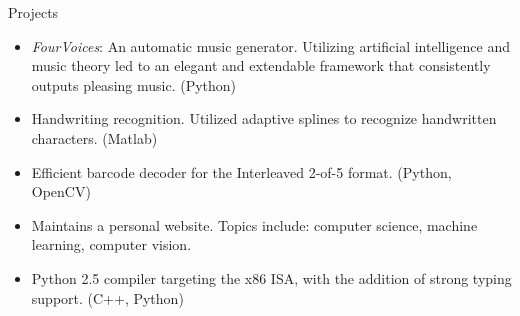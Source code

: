 \documentclass{resume}
\begin{document}
\begin{component}{Projects}
	\begin{itemize}
		\vspace{-0.5em}\item \emph{FourVoices}: An automatic music generator. Utilizing artificial intelligence and music theory led to an elegant and extendable framework that consistently outputs pleasing music.
		(Python)
        \vspace{-0.5em}\item Handwriting recognition. Utilized adaptive splines to recognize handwritten characters. (Matlab)
        \vspace{-0.5em}\item Efficient barcode decoder
	        for the Interleaved 2-of-5 format. (Python, OpenCV)
        \vspace{-0.5em}\item Maintains a personal website. Topics include: 
        computer science, machine learning, computer vision.
		\vspace{-0.5em}\item Python 2.5 compiler targeting the x86 ISA, with the addition of
		strong typing support. (C++, Python)
	\end{itemize}
\end{component}

\vspace{-0.5em}
\end{document}
